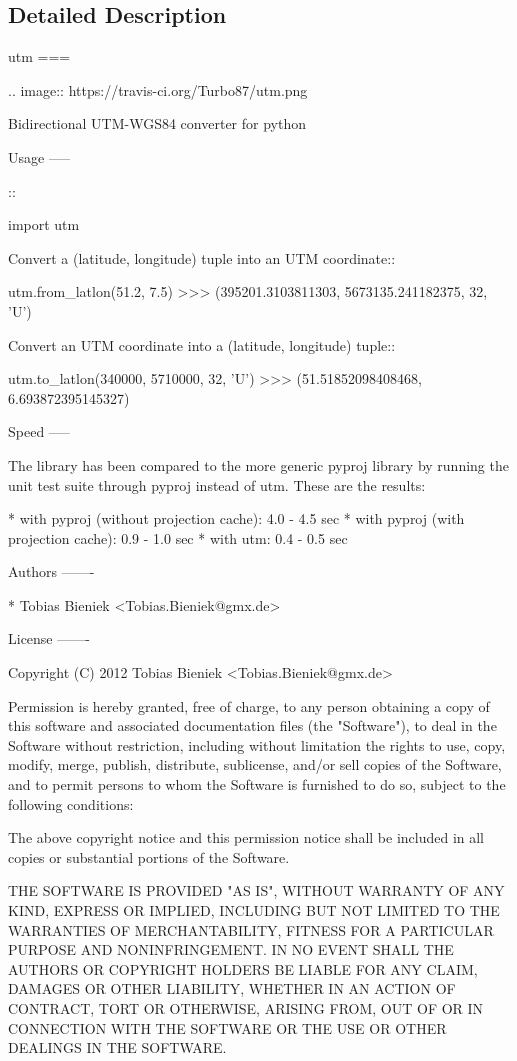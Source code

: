 \subsection{Detailed Description}
\begin{DoxyVerb}utm
===

.. image:: https://travis-ci.org/Turbo87/utm.png

Bidirectional UTM-WGS84 converter for python

Usage
-----

::

  import utm

Convert a (latitude, longitude) tuple into an UTM coordinate::

  utm.from_latlon(51.2, 7.5)
  >>> (395201.3103811303, 5673135.241182375, 32, 'U')

Convert an UTM coordinate into a (latitude, longitude) tuple::

  utm.to_latlon(340000, 5710000, 32, 'U')
  >>> (51.51852098408468, 6.693872395145327)

Speed
-----

The library has been compared to the more generic pyproj library by running the
unit test suite through pyproj instead of utm. These are the results:

* with pyproj (without projection cache): 4.0 - 4.5 sec
* with pyproj (with projection cache): 0.9 - 1.0 sec
* with utm: 0.4 - 0.5 sec

Authors
-------

* Tobias Bieniek <Tobias.Bieniek@gmx.de>

License
-------

Copyright (C) 2012 Tobias Bieniek <Tobias.Bieniek@gmx.de>

Permission is hereby granted, free of charge, to any person obtaining a copy of
this software and associated documentation files (the "Software"), to deal in
the Software without restriction, including without limitation the rights to
use, copy, modify, merge, publish, distribute, sublicense, and/or sell copies
of the Software, and to permit persons to whom the Software is furnished to do
so, subject to the following conditions:

The above copyright notice and this permission notice shall be included in all
copies or substantial portions of the Software.

THE SOFTWARE IS PROVIDED "AS IS", WITHOUT WARRANTY OF ANY KIND, EXPRESS OR
IMPLIED, INCLUDING BUT NOT LIMITED TO THE WARRANTIES OF MERCHANTABILITY,
FITNESS FOR A PARTICULAR PURPOSE AND NONINFRINGEMENT. IN NO EVENT SHALL THE
AUTHORS OR COPYRIGHT HOLDERS BE LIABLE FOR ANY CLAIM, DAMAGES OR OTHER
LIABILITY, WHETHER IN AN ACTION OF CONTRACT, TORT OR OTHERWISE, ARISING FROM,
OUT OF OR IN CONNECTION WITH THE SOFTWARE OR THE USE OR OTHER DEALINGS IN THE
SOFTWARE.
\end{DoxyVerb}
 

